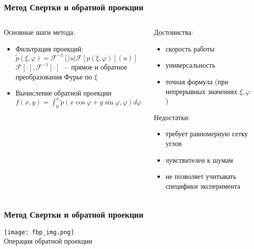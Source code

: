 \begin{frame}
\frametitle{Метод Свертки и обратной проекции}
\begin{columns}
  \hspace{-0.1cm}
  \begin{column}{0.6\textwidth}
    Основные шаги метода:
    \begin{itemize}
    \item Фильтрация проекций: $\tilde{p}(\xi, \varphi) = \mathscr F ^{-1}[|u| \mathscr F[p(\xi, \varphi)](u)]$\\
    $\mathscr F[\cdot], \mathscr F ^{-1}[\cdot]$ --- прямое и обратное преобразования Фурье по $\xi$\\
    \vspace{10pt}
    \item Вычисление обратной проекции $f(x,y) = \int_0^\pi {\tilde{p} (x \cos\varphi + y \sin \varphi, \varphi) d\varphi}$
    \end{itemize}
  \end{column}

  \begin{column}{0.6\textwidth}
  Достоинства:
  \begin{itemize}
    \item скорость работы
    \item универсальность
    \item точная формула (при непрерывных значениях $\xi, \varphi$)
  \end{itemize}
  Недостатки:
  \begin{itemize}
    \item требует равномерную сетку углов
    \item чувствителен к шумам
    \item не позволяет учитывать специфики эксперимента
  \end{itemize}
  \end{column}
\end{columns}
\end{frame}

\begin{frame}
\centering
\frametitle{Метод Свертки и обратной проекции}
  \texttt{[image: fbp\_img.png]}
  \\
  Операция обратной проекции
\end{frame}


